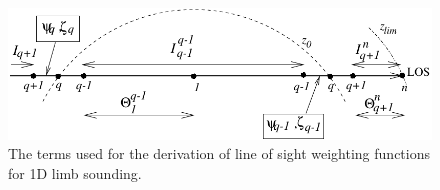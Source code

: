  \begin{figure}[tb]
  \begin{center}
   \includegraphics*[width=0.95\hsize]{Figs/wf2}
   \caption{The terms used for the derivation of line of sight weighting
            functions for 1D limb sounding.}
   \label{fig:wfuns:limb}  
  \end{center}
 \end{figure}
 
